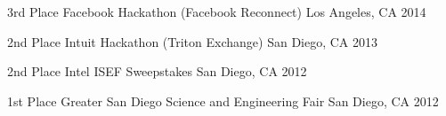 

\begin{cvhonors}
  \cvhonor
    {3rd Place} %
    {Facebook Hackathon (Facebook Reconnect)} %
    {Los Angeles, CA} %
    {2014} %
    
  \cvhonor
    {2nd Place} %
    {Intuit Hackathon (Triton Exchange)} %
    {San Diego, CA} %
    {2013} %
    
  \cvhonor
    {2nd Place} %
    {Intel ISEF Sweepstakes} %
    {San Diego, CA} %
    {2012} %
    
  \cvhonor
    {1st Place} %
    {Greater San Diego Science and Engineering Fair} %
    {San Diego, CA} %
    {2012} %
    
\end{cvhonors}

